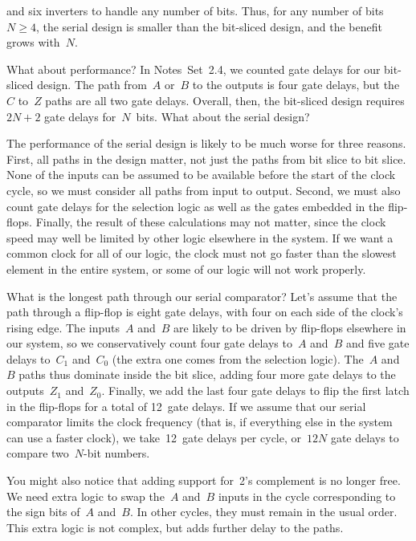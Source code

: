 and six inverters to handle any number of bits.
%
Thus, for any number of bits~$N\geq{4}$, the serial design is smaller
than the bit-sliced design, and the benefit grows with~$N$.

What about performance?  In Notes~Set~2.4, we counted gate delays for 
our bit-sliced design.  The path from~$A$ or~$B$ to the outputs is
four gate delays, but the~$C$ to~$Z$ paths are all two gate delays.
Overall, then, the bit-sliced design requires~$2N+2$ gate delays 
for~$N$~bits.  What about the serial design?

The performance of the serial design is likely to be much worse
for three reasons.
%
First, all paths in the design matter, not just the paths from bit
slice to bit slice.  None of the inputs can be assumed to be available
before the start of the clock cycle, so we must consider all paths
from input to output.  
%
Second, we must also count gate delays for the
selection logic as well as the gates embedded in the flip-flops.
%
Finally, the result of these calculations may not matter, since the
clock speed may well be limited by other logic elsewhere in the
system.  If we want a common clock for all of our logic, the clock
must not go faster than the slowest element in the entire system, or
some of our logic will not work properly.

What is the longest path through our serial comparator?
%
Let's assume that 
the path through a flip-flop is eight gate delays, with four on each 
side of the clock's rising edge.  The inputs~$A$ and~$B$ are
likely to be driven by flip-flops elsewhere in our system, so
we conservatively count four gate delays to~$A$ and~$B$ and
five gate delays to~$C_1$ and~$C_0$ (the extra one comes from
the selection logic).  The~$A$ and~$B$ paths thus dominate inside
the bit slice, adding four more gate delays to the outputs~$Z_1$
and~$Z_0$.  Finally, we add the last four gate delays to flip
the first latch in the flip-flops for a total of 12~gate delays.
%
If we assume that our serial comparator limits the clock frequency
(that is, if everything else in the system can use a faster clock),
we take~12~gate delays per cycle, or~$12N$ gate delays to compare
two~\mbox{$N$-bit} numbers.

You might also notice that adding support for~2's complement is no 
longer free.  We need extra logic to swap the~$A$ and~$B$ inputs
in the cycle corresponding to the sign bits of~$A$ and~$B$.  In
other cycles, they must remain in the usual order.  This extra
logic is not complex, but adds further delay to the paths.

